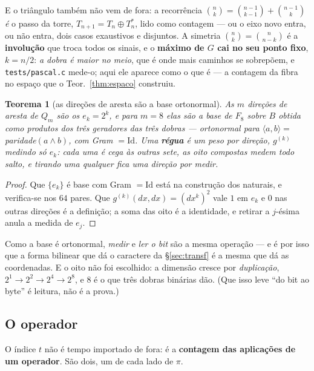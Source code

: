 \documentclass[11pt,a4paper]{article}
\newcommand{\code}[1]{\texttt{\small #1}}
\newtheorem{teorema}{Teorema}
\begin{document}
\medskip\noindent E o triângulo também não vem de fora: a recorrência
$\binom{n}{k}=\binom{n-1}{k-1}+\binom{n-1}{k}$ \emph{é} o passo da torre,
$T_{n+1}=T_n\oplus T_n^{*}$, lido como contagem --- ou o eixo novo entra, ou não
entra, dois casos exaustivos e disjuntos. A simetria
$\binom{n}{k}=\binom{n}{n-k}$ é a \textbf{involução} que troca todos os sinais, e
o \textbf{máximo de $G$ cai no seu ponto fixo}, $k=n/2$: \emph{a dobra é maior no
meio}, que é onde mais caminhos se sobrepõem, e \code{tests/pascal.c} mede-o;
aqui ele aparece como o que é --- a contagem da
fibra no espaço que o Teor.~\ref{thm:espaco} construiu.

\begin{teorema}[as direções de aresta são a base ortonormal]\label{thm:base8}
As $m$ direções de aresta de $Q_m$ são os $e_k=2^{k}$, e para $m=8$ elas são a
base de $F_8$ sobre $B$ obtida como \emph{produtos} dos três
geradores das três dobras --- ortonormal para
$\langle a,b\rangle=$ paridade$(a\wedge b)$, com Gram $=\mathrm{Id}$. Uma \textbf{régua} é
um peso por direção, $g^{(k)}$ medindo só $e_k$: cada uma é cega às outras sete,
as oito compostas medem todo salto, e tirando uma qualquer fica uma direção por
medir.
\end{teorema}

\begin{proof}
Que $\{e_k\}$ é base com Gram $=\mathrm{Id}$ está na construção dos naturais, e verifica-se
nos $64$ pares. Que $g^{(k)}(dx,dx)=(dx^{k})^{2}$ vale $1$ em $e_k$ e $0$ nas
outras direções é a definição; a soma das oito é a identidade, e retirar a
$j$-ésima anula a medida de $e_j$.
\end{proof}

\medskip\noindent Como a base é ortonormal, \emph{medir} e \emph{ler o bit} são a
mesma operação --- e é por isso que a forma bilinear que dá o caractere da
§\ref{sec:transf} é a mesma que dá as coordenadas. E o oito não foi escolhido:
a dimensão cresce por \emph{duplicação}, $2^{1}\to2^{2}\to2^{4}\to2^{8}$, e $8$
é o que três dobras binárias dão. (Que isso leve ``do bit ao byte'' é leitura,
não é a prova.)

\subsection*{O operador}

\noindent O índice $t$ não é tempo importado de fora: é a \textbf{contagem das
aplicações de um operador}. São dois, um de cada lado de $\pi$.
\end{document}
